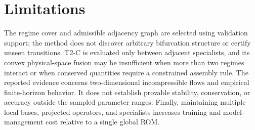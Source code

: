 \section{Limitations}

The regime cover and admissible adjacency graph are selected using validation support; the method does not discover arbitrary bifurcation structure or certify unseen transitions. T2-C is evaluated only between adjacent specialists, and its convex physical-space fusion may be insufficient when more than two regimes interact or when conserved quantities require a constrained assembly rule. The reported evidence concerns two-dimensional incompressible flows and empirical finite-horizon behavior. It does not establish provable stability, conservation, or accuracy outside the sampled parameter ranges. Finally, maintaining multiple local bases, projected operators, and specialists increases training and model-management cost relative to a single global ROM.
